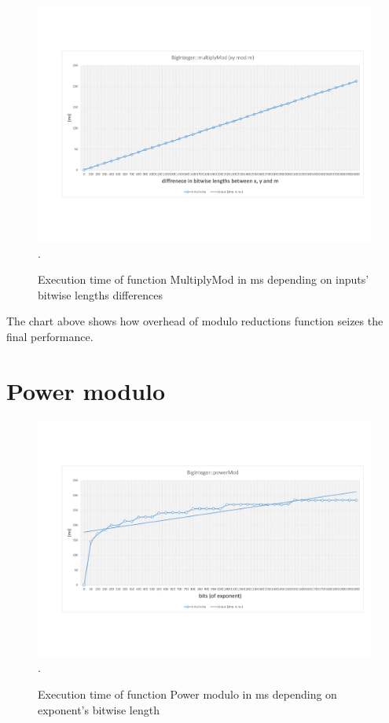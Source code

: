 \documentclass[oneside,openright,12pt,final,en]{mgr}
\begin{document}
\begin{figure}[H]
	\centering
	\includegraphics[width=\textwidth,trim={0.5cm 2.8cm 0.4cm 2.8cm},clip]{mull_mod_diff.pdf}.
	\caption{Execution time of function MultiplyMod in ms depending on inputs' bitwise lengths differences}
	\label{fig:mull_mod_diff}
\end{figure}

The chart above shows how overhead of modulo reductions function seizes the final performance.

\section{Power modulo}


\begin{figure}[H]
	\centering
	\includegraphics[width=\textwidth,trim={0.5cm 2.8cm 0.4cm 2.8cm},clip]{powmod.pdf}.
	\caption{Execution time of function Power modulo in ms depending on exponent's bitwise length}
	\label{fig:powmod}
\end{figure}
\end{document}
